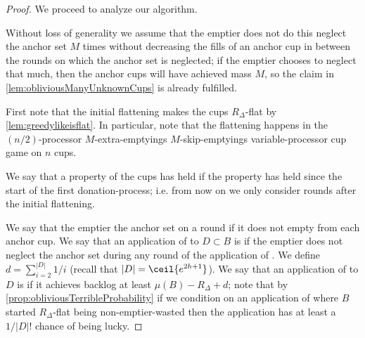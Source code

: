 \begin{proof}
We proceed to analyze our algorithm.

Without loss of generality we assume that the emptier does not do
this neglect the anchor set $M$ times without decreasing the
fills of an anchor cup in between the rounds on which the anchor
set is neglected; if the emptier chooses to neglect that much,
then the anchor cups will have achieved mass $M$, so the claim in
\cref{lem:obliviousManyUnknownCups} is already fulfilled. 

First note that the initial flattening makes the cups
$R_\Delta$-flat by \cref{lem:greedylikeisflat}. In particular,
note that the flattening happens in the $(n/2)$-processor
$M$-extra-emptyings $M$-skip-emptyings variable-processor cup
game on $n$ cups.

We say that a property of the cups has  held if the
property has held since the start of the first donation-process;
i.e. from now on we only consider rounds after the initial
flattening.

We say that the emptier  the anchor set on a round
if it does not empty from each anchor cup. We say that an
application of \randalg to $D\subset B$ is
 if the emptier does not neglect the
anchor set during any round of the application of \randalg. We
define $d = \sum_{i=2}^{|D|} 1/i$ (recall that $|D| =
\ceil{e^{2h+1}}$). We say that an application of \randalg to $D$
is  if it achieves backlog at least $\mu(B) -
R_\Delta + d$; note that by
\cref{prop:obliviousTerribleProbability} if we condition on an
application of \randalg where $B$ started $R_\Delta$-flat being
non-emptier-wasted then the application has at least a $1/|D|!$
chance of being lucky.


\end{proof}
